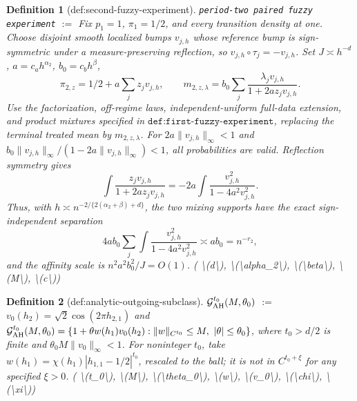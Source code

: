 \documentclass{article}
\newtheorem{definition}{Definition}
\begin{document}
\begin{definition}[def:second-fuzzy-experiment]\label{def:second-fuzzy-experiment}
\texttt{period-two paired fuzzy experiment} $:=$ Fix \(p_1=1\), \(\pi_1=1/2\), and every transition density at one. Choose disjoint smooth localized bumps \(v_{j,h}\) whose reference bump is sign-symmetric under a measure-preserving reflection, so \(v_{j,h}\circ\tau_j=-v_{j,h}\). Set \(J\asymp h^{-d}\), \(a=c_ah^{\alpha_2}\), \(b_0=c_bh^\beta\),
\[
\pi_{2,z}=1/2+a\sum_jz_jv_{j,h},
\qquad
m_{2,z,\lambda}=b_0\sum_j\frac{\lambda_jv_{j,h}}{1+2az_jv_{j,h}}.
\]
Use the factorization, off-regime laws, independent-uniform full-data extension, and product mixtures specified in \(\texttt{def:first-fuzzy-experiment}\), replacing the terminal treated mean by \(m_{2,z,\lambda}\). For \(2a\|v_{j,h}\|_\infty<1\) and \(b_0\|v_{j,h}\|_\infty/(1-2a\|v_{j,h}\|_\infty)<1\), all probabilities are valid. Reflection symmetry gives
\[
\int\frac{z_jv_{j,h}}{1+2az_jv_{j,h}}
=-2a\int\frac{v_{j,h}^2}{1-4a^2v_{j,h}^2}.
\]
Thus, with \(h\asymp n^{-2/\{2(\alpha_2+\beta)+d\}}\), the two mixing supports have the exact sign-independent separation
\[
4ab_0\sum_j\int\frac{v_{j,h}^2}{1-4a^2v_{j,h}^2}\asymp ab_0=n^{-r_2},
\]
and the affinity scale is \(n^2a^2b_0^2/J=O(1)\). \quad ( \textbackslash{}(d\textbackslash{}), \textbackslash{}(\textbackslash{}alpha\_2\textbackslash{}), \textbackslash{}(\textbackslash{}beta\textbackslash{}), \textbackslash{}(M\textbackslash{}), \textbackslash{}(c\textbackslash{}))
\end{definition}

\begin{definition}[def:analytic-outgoing-subclass]\label{def:analytic-outgoing-subclass}
\(\mathcal G_{\rm AH}^{t_0}(M,\theta_0)\) $:=$ \(v_0(h_2)=\sqrt2\cos(2\pi h_{2,1})\) and \(\mathcal G_{\rm AH}^{t_0}(M,\theta_0)=\{1+\theta w(h_1)v_0(h_2):\|w\|_{C^{t_0}}\le M,\ |\theta|\le\theta_0\}\), where \(t_0>d/2\) is finite and \(\theta_0M\|v_0\|_\infty<1\). For noninteger \(t_0\), take \(w(h_1)=\chi(h_1)|h_{1,1}-1/2|^{t_0}\), rescaled to the ball; it is not in \(C^{t_0+\xi}\) for any specified \(\xi>0\). \quad ( \textbackslash{}(t\_0\textbackslash{}), \textbackslash{}(M\textbackslash{}), \textbackslash{}(\textbackslash{}theta\_0\textbackslash{}), \textbackslash{}(w\textbackslash{}), \textbackslash{}(v\_0\textbackslash{}), \textbackslash{}(\textbackslash{}chi\textbackslash{}), \textbackslash{}(\textbackslash{}xi\textbackslash{}))
\end{definition}
\end{document}
